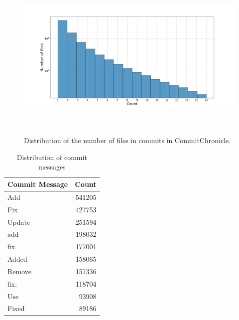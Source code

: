 \begin{figure}[H]
    \includegraphics[scale=0.30]{figs/Commit num files distribution_comchron.png}
    \caption{Distribution of the number of files in commits in CommitChronicle.}~\label{fig:num_files_dist_CommitChronicle}
\end{figure}

\begin{table}[h]
    \centering
    \caption{Distribution of commit messages}\label{tab:commit_messages_CommitChronicle}
    \begin{tabular}{|l|r|} %
    \hline %
    \textbf{Commit Message} & \textbf{Count} \\ 
    \hline %
    Add       & 541205 \\ \hline %
    Fix       & 427753 \\ \hline %
    Update    & 251594 \\ \hline %
    add       & 198032 \\ \hline %
    fix       & 177001 \\ \hline %
    Added     & 158065 \\ \hline %
    Remove    & 157336 \\ \hline %
    fix:      & 118704 \\ \hline %
    Use       & 93908  \\ \hline %
    Fixed     & 89186  \\ \hline %
    \end{tabular}
\end{table}

